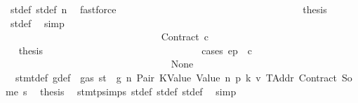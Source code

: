 \begin{isabellebody}
\ st{\isacharprime}{\kern0pt}{\isacharunderscore}{\kern0pt}def\ st{\isacharprime}{\kern0pt}{\isacharprime}{\kern0pt}{\isacharunderscore}{\kern0pt}def\ n\ \isamarkupfalse%
\ fastforce\isanewline
\ \ \ \ \ \ \ \ \ \ \ \ \ \ \ \ \ \ \ \ \ \ \ \ \ \ \ \ \ \ \ \ \ \ \isamarkupfalse%
\ \isamarkupfalse%
\ {\isacharquery}{\kern0pt}thesis\ \isamarkupfalse%
\ st{\isacharprime}{\kern0pt}{\isacharunderscore}{\kern0pt}def\ \isamarkupfalse%
\ simp\isanewline
\ \ \ \ \ \ \ \ \ \ \ \ \ \ \ \ \ \ \ \ \ \ \ \ \ \ \ \ \ \ \isamarkupfalse%
\isanewline
\ \ \ \ \ \ \ \ \ \ \ \ \ \ \ \ \ \ \ \ \ \ \ \ \ \ \ \ \isamarkupfalse%
\isanewline
\ \ \ \ \ \ \ \ \ \ \ \ \ \ \ \ \ \ \ \ \ \ \ \ \ \ \ \ \ \ \isamarkupfalse%
\ {\isacharparenleft}{\kern0pt}Contract\ c{\isacharparenright}{\kern0pt}\isanewline
\ \ \ \ \ \ \ \ \ \ \ \ \ \ \ \ \ \ \ \ \ \ \ \ \ \ \ \ \ \ \isamarkupfalse%
\ \isamarkupfalse%
\ {\isacharquery}{\kern0pt}thesis\isanewline
\ \ \ \ \ \ \ \ \ \ \ \ \ \ \ \ \ \ \ \ \ \ \ \ \ \ \ \ \ \ \isamarkupfalse%
\ {\isacharparenleft}{\kern0pt}cases\ {\isachardoublequoteopen}ep\ {\isachardollar}{\kern0pt}{\isachardollar}{\kern0pt}\ c{\isachardoublequoteclose}{\isacharparenright}{\kern0pt}\isanewline
\ \ \ \ \ \ \ \ \ \ \ \ \ \ \ \ \ \ \ \ \ \ \ \ \ \ \ \ \ \ \ \ \isamarkupfalse%
\ None\isanewline
\ \ \ \ \ \ \ \ \ \ \ \ \ \ \ \ \ \ \ \ \ \ \ \ \ \ \ \ \ \ \ \ \isamarkupfalse%
\ {}{\isacharparenleft}{\kern0pt}{}{\isacharparenright}{\kern0pt}\ stmt{\isacharunderscore}{\kern0pt}def\ g{\isacharunderscore}{\kern0pt}def\ {\isacharbackquoteopen}{\isasymnot}\ gas\ st\ {\isasymle}\ g{\isacharbackquoteclose}\ n\ Pair\ KValue\ Value\ n{}\ p{}\ k{}\ v{}\ TAddr\ Contract\ Some\ s{}\ \isamarkupfalse%
\ {\isacharquery}{\kern0pt}thesis\ \isamarkupfalse%
\ stmt{\isachardot}{\kern0pt}psimps{\isacharparenleft}{\kern0pt}{}{\isacharparenright}{\kern0pt}\ st{\isacharprime}{\kern0pt}{\isacharunderscore}{\kern0pt}def\ st{\isacharprime}{\kern0pt}{\isacharprime}{\kern0pt}{\isacharunderscore}{\kern0pt}def\ st{\isacharprime}{\kern0pt}{\isacharprime}{\kern0pt}{\isacharprime}{\kern0pt}{\isacharunderscore}{\kern0pt}def\ \isamarkupfalse%
\ simp\isanewline
\ \ \ \ \ \ \ \ \ \ \ \ \ \ \ \ \ \ \ \ \ \ \ \ \ \ \ \ \ \ \isamarkupfalse%
\isanewline

\end{isabellebody}

